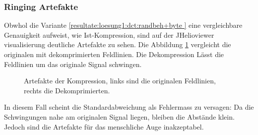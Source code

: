 \subsubsection{Ringing Artefakte}\label{resultate:loesung1:ringing}
Obwhol die Variante \ref{resultate:loesung1:dct:randbeh+byte } eine vergleichbare Genauigkeit aufweist, wie Ist-Kompression, sind auf der JHelioviewer visualisierung deutliche Artefakte zu sehen. Die Abbildung \ref{resultate:loesung1:dct:randbehandlung:jvhartefakte} vergleicht die originalen mit dekomprimierten Feldlinien. Die Dekompression Lässt die Feldlinien um das originale Signal schwingen.
\begin{figure}[!htbp]
	\center
	\caption{Artefakte der Kompression, links sind die originalen Feldlinien, rechts die Dekomprimierten.}
	\label{resultate:loesung1:dct:randbehandlung:jvhartefakte}
\end{figure} 
In diesem Fall scheint die Standardabweichung als Fehlermass zu versagen: Da die Schwingungen nahe am originalen Signal liegen, bleiben die Abstände klein. Jedoch sind die Artefakte für das menschliche Auge inakzeptabel.\\
